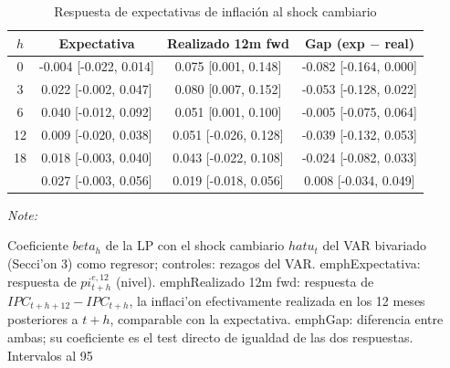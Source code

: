 \begin{table}[!h]
\centering
\caption{\label{tab:p8_inf}Respuesta de expectativas de inflación al shock cambiario}
\centering
\begin{threeparttable}
\begin{tabular}[t]{cccc}
\toprule
$h$ & Expectativa & Realizado 12m fwd & Gap (exp $-$ real)\\
\midrule
0 & -0.004 [-0.022, 0.014] & 0.075 [0.001, 0.148] & -0.082 [-0.164, 0.000]\\
3 & 0.022 [-0.002, 0.047] & 0.080 [0.007, 0.152] & -0.053 [-0.128, 0.022]\\
6 & 0.040 [-0.012, 0.092] & 0.051 [0.001, 0.100] & -0.005 [-0.075, 0.064]\\
12 & 0.009 [-0.020, 0.038] & 0.051 [-0.026, 0.128] & -0.039 [-0.132, 0.053]\\
18 & 0.018 [-0.003, 0.040] & 0.043 [-0.022, 0.108] & -0.024 [-0.082, 0.033]\\
\addlinespace
24 & 0.027 [-0.003, 0.056] & 0.019 [-0.018, 0.056] & 0.008 [-0.034, 0.049]\\
\bottomrule
\end{tabular}
\begin{tablenotes}
\item \textit{Note: } 
\item Coeficiente $beta_h$ de la LP con el shock cambiario $hat u_t$ del VAR bivariado (Secci'on 3) como regresor; controles: rezagos del VAR. emph{Expectativa}: respuesta de $pi^{e,12}_{t+h}$ (nivel). emph{Realizado 12m fwd}: respuesta de $IPC_{t+h+12}-IPC_{t+h}$, la inflaci'on efectivamente realizada en los 12 meses posteriores a $t+h$, comparable con la expectativa. emph{Gap}: diferencia entre ambas; su coeficiente es el test directo de igualdad de las dos respuestas. Intervalos al 95%
\end{tablenotes}
\end{threeparttable}
\end{table}